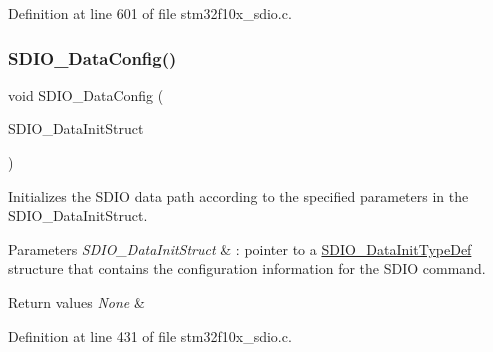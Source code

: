 Definition at line 601 of file stm32f10x\+\_\+sdio.\+c.

\mbox{\label{group___s_d_i_o___private___functions_gad65d896ae919683585bda44a1e2afae4}} 
\subsubsection{\texorpdfstring{S\+D\+I\+O\+\_\+\+Data\+Config()}{SDIO\_DataConfig()}}
{\footnotesize\ttfamily void S\+D\+I\+O\+\_\+\+Data\+Config (\begin{DoxyParamCaption}\item[{\hyperlink{struct_s_d_i_o___data_init_type_def}{S\+D\+I\+O\+\_\+\+Data\+Init\+Type\+Def} $\ast$}]{S\+D\+I\+O\+\_\+\+Data\+Init\+Struct }\end{DoxyParamCaption})}



Initializes the S\+D\+IO data path according to the specified parameters in the S\+D\+I\+O\+\_\+\+Data\+Init\+Struct. 


\begin{DoxyParams}{Parameters}
{\em S\+D\+I\+O\+\_\+\+Data\+Init\+Struct} & \+: pointer to a \hyperlink{struct_s_d_i_o___data_init_type_def}{S\+D\+I\+O\+\_\+\+Data\+Init\+Type\+Def} structure that contains the configuration information for the S\+D\+IO command. \\
\hline
\end{DoxyParams}

\begin{DoxyRetVals}{Return values}
{\em None} & \\
\hline
\end{DoxyRetVals}


Definition at line 431 of file stm32f10x\+\_\+sdio.\+c.

\mbox{\label{group___s_d_i_o___private___functions_gaa83209c09e921521aca2587fb5b22ea2}} 
